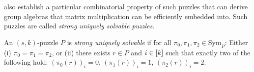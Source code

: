 \documentclass[11pt]{article}
\newcommand\Sym[1]{\ensuremath{\mathrm{Sym}_{#1}}}
\begin{document}
\cite{cksu05} also establish a particular combinatorial property of
such puzzles that can derive group algebras that matrix multiplication can be
efficiently embedded into.  Such puzzles are called \emph{strong uniquely
solvable puzzles}.





\begin{definition}
  \label{def:strong-USP}
  An $(s,k)$-puzzle $P$ is \emph{strong uniquely solvable} if for all
  $\pi_0, \pi_1, \pi_2 \in \Sym{P}$: Either (i) $\pi_0 = \pi_1 = \pi_2$,
  or (ii) there exists $r \in P$ and $i \in [k]$ such that exactly
  two of the following hold: $(\pi_0(r))_i = 0$, $(\pi_1(r))_i = 1$,
  $(\pi_2(r))_i = 2$.
\end{definition}
\end{document}
